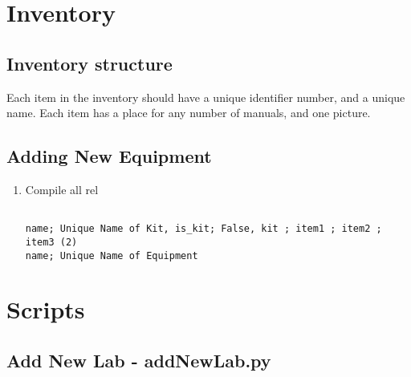 \documentclass[justified]{book}
\begin{document}
\section{Inventory}

\subsection{Inventory structure}

Each item in the inventory should have a unique identifier number, and a unique name. Each item has a place for any number of manuals, and one picture. 


\subsection{Adding New Equipment}



\begin{enumerate}
\item Compile all rel

	\begin{lstlisting}[backgroundcolor = \color{light-gray}, 	caption = The file info.csv needs to be in this form.
	               language = csv, xleftmargin = -2cm, xrightmargin = -2cm,
                   framexleftmargin = 1em
                   ]
                   
name; Unique Name of Kit, is_kit; False, kit ; item1 ; item2 ; item3 (2)
name; Unique Name of Equipment

\end{lstlisting}

\end{enumerate}

\section{Scripts}

\subsection{Add New Lab - addNewLab.py}





\end{document}
